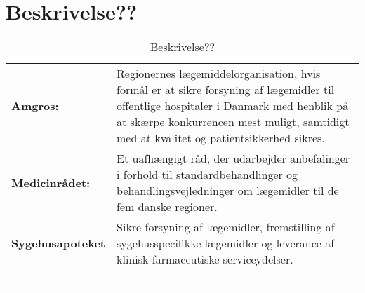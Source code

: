 \section*{Beskrivelse??}
\begin{table}[H]
\begin{tabular}{p{3cm} p{11cm}}
\textbf{Amgros:} & Regionernes lægemiddelorganisation, hvis formål er at sikre forsyning af lægemidler til offentlige hospitaler i Danmark med henblik på at skærpe konkurrencen mest muligt, samtidigt med at kvalitet og patientsikkerhed sikres. \vspace{0.5cm}
\\ 
\textbf{Medicinrådet:} & Et uafhængigt råd, der udarbejder anbefalinger i forhold til standardbehandlinger og behandlingsvejledninger om lægemidler til de fem danske regioner. \vspace{0.5cm} \\
\textbf{Sygehusapoteket} & Sikre forsyning af lægemidler,
fremstilling af sygehusspecifikke lægemidler og leverance af klinisk farmaceutiske serviceydelser. \vspace{0.5cm} \\
& \vspace{0.5cm} \\
& \vspace{0.5cm} \\
& \vspace{0.5cm} \\
& \vspace{0.5cm} \\
\end{tabular}
\caption{Beskrivelse??}
\label{table:beskrivelse}
\end{table}